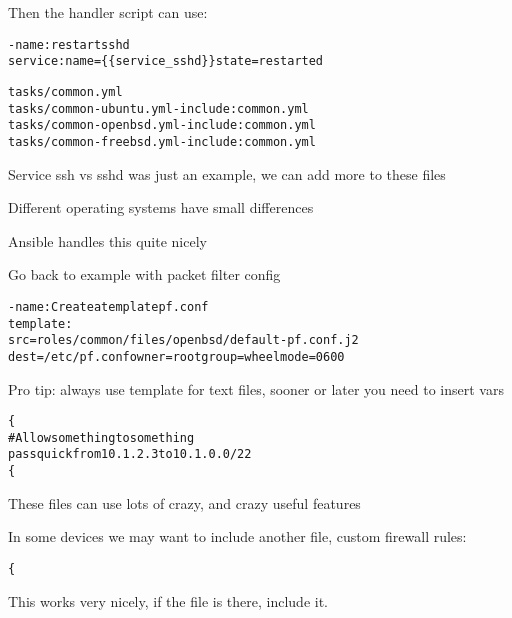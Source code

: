 \documentclass[18pt,landscape,a4paper,footrule]{foils}
\begin{document}
Then the handler script can use:
\begin{alltt}
  - name: restart sshd
    service: name=\{\{ service_sshd \}\} state=restarted
\end{alltt}




\begin{alltt}
tasks/common.yml
tasks/common-ubuntu.yml - include: common.yml
tasks/common-openbsd.yml - include: common.yml
tasks/common-freebsd.yml - include: common.yml
\end{alltt}

\begin{list2}
\item Service ssh vs sshd was just an example, we can add more to these files
\item Different operating systems have small differences
\item Ansible handles this quite nicely
\end{list2}



Go back to example with packet filter config

\begin{alltt}
  - name: Create a template pf.conf
    template:
        src=roles/common/files/openbsd/default-pf.conf.j2
        dest=/etc/pf.conf owner=root group=wheel mode=0600
\end{alltt}

Pro tip: always use template for text files, sooner or later you need to insert vars

\begin{alltt}\scriptsize
\{% if inventory_hostname_short == "fw-01" or inventory_hostname_short == "fw-02" %\}
# Allow something to something
pass quick from 10.1.2.3 to 10.1.0.0/22
\{% endif %\}
\end{alltt}
These files can use lots of crazy, and crazy useful features


In some devices we may want to include another file, custom firewall rules:
\begin{alltt}\footnotesize
\{% include "custom-pf/" + inventory_hostname ignore missing %\}
\end{alltt}

This works very nicely, if the file is there, include it.

\end{document}
